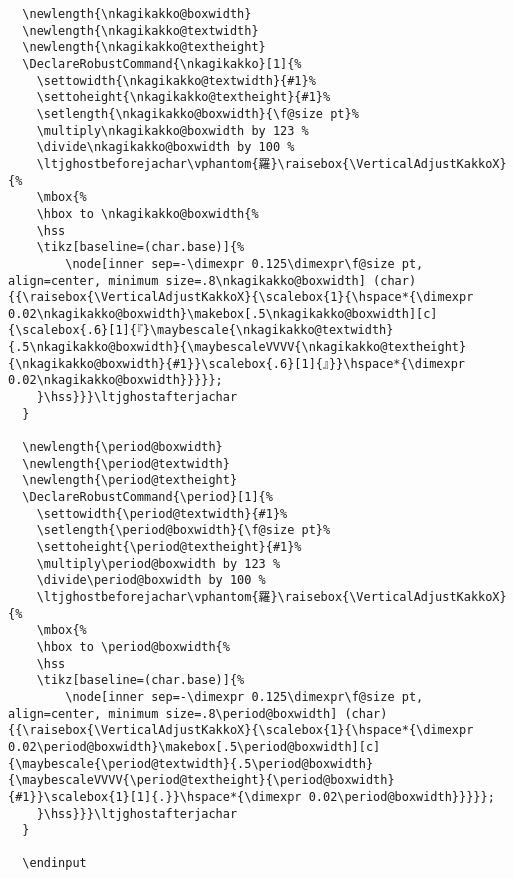 \documentclass[luatex,fontsize=10pt,paper=b5,twoside]{jlreq}%
\begin{document}
\begin{lstlisting}
  \newlength{\nkagikakko@boxwidth}
  \newlength{\nkagikakko@textwidth}
  \newlength{\nkagikakko@textheight}
  \DeclareRobustCommand{\nkagikakko}[1]{%
    \settowidth{\nkagikakko@textwidth}{#1}%
    \settoheight{\nkagikakko@textheight}{#1}%
    \setlength{\nkagikakko@boxwidth}{\f@size pt}%
    \multiply\nkagikakko@boxwidth by 123 %
    \divide\nkagikakko@boxwidth by 100 %
    \ltjghostbeforejachar\vphantom{羅}\raisebox{\VerticalAdjustKakkoX}{%
    \mbox{%
    \hbox to \nkagikakko@boxwidth{%
    \hss
    \tikz[baseline=(char.base)]{%
        \node[inner sep=-\dimexpr 0.125\dimexpr\f@size pt, align=center, minimum size=.8\nkagikakko@boxwidth] (char) {{\raisebox{\VerticalAdjustKakkoX}{\scalebox{1}{\hspace*{\dimexpr 0.02\nkagikakko@boxwidth}\makebox[.5\nkagikakko@boxwidth][c]{\scalebox{.6}[1]{『}\maybescale{\nkagikakko@textwidth}{.5\nkagikakko@boxwidth}{\maybescaleVVVV{\nkagikakko@textheight}{\nkagikakko@boxwidth}{#1}}\scalebox{.6}[1]{』}}\hspace*{\dimexpr 0.02\nkagikakko@boxwidth}}}}};
    }\hss}}}\ltjghostafterjachar
  }

  \newlength{\period@boxwidth}
  \newlength{\period@textwidth}
  \newlength{\period@textheight}
  \DeclareRobustCommand{\period}[1]{%
    \settowidth{\period@textwidth}{#1}%
    \setlength{\period@boxwidth}{\f@size pt}%
    \settoheight{\period@textheight}{#1}%
    \multiply\period@boxwidth by 123 %
    \divide\period@boxwidth by 100 %
    \ltjghostbeforejachar\vphantom{羅}\raisebox{\VerticalAdjustKakkoX}{%
    \mbox{%
    \hbox to \period@boxwidth{%
    \hss
    \tikz[baseline=(char.base)]{%
        \node[inner sep=-\dimexpr 0.125\dimexpr\f@size pt, align=center, minimum size=.8\period@boxwidth] (char) {{\raisebox{\VerticalAdjustKakkoX}{\scalebox{1}{\hspace*{\dimexpr 0.02\period@boxwidth}\makebox[.5\period@boxwidth][c]{\maybescale{\period@textwidth}{.5\period@boxwidth}{\maybescaleVVVV{\period@textheight}{\period@boxwidth}{#1}}\scalebox{1}[1]{.}}\hspace*{\dimexpr 0.02\period@boxwidth}}}}};
    }\hss}}}\ltjghostafterjachar
  }

  \endinput
\end{lstlisting}
\end{document}
